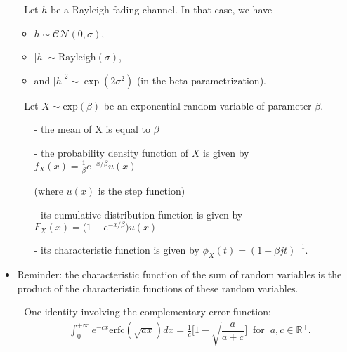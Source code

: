 \documentclass [a4paper, 11pt] {article}
\begin{document}
\begin{exercise}{1}
\begin{itemize}
    \item[-] Let $h$ be a Rayleigh fading channel. In that case, we have
    \begin{itemize}
        \item $h \sim \mathcal{C}\mathcal{N}(0,\sigma)$,
        \item $|h| \sim \text{Rayleigh}(\sigma)$,
        \item and $|h|^2 \sim \exp(2\sigma^2)$ (in the beta parametrization).
    \end{itemize}

    \item[-] Let $X \sim \text{exp}(\beta)$ be an exponential random variable of parameter $\beta$.

    \begin{itemize}
    \item[-] the mean of X is equal to $\beta$
    \item[-] the probability density function of $X$ is given by $f_X(x) = \frac{1}{\beta}e^{-x/\beta}u(x)$
    \item[] (where $u(x)$ is the step function)
    \item[-] its cumulative distribution function is given by $F_X(x) = \big(1 - e^{-x/\beta}\big)u(x)$
    \item[-] its characteristic function is given by $\phi_X(t) = (1-\beta jt)^{-1}$.
    \end{itemize}
    \item Reminder: the characteristic function of the sum of random variables is the product of the characteristic functions of these random variables.
    \item[-] One identity involving the complementary error function:
    \begin{align}
    &\int^{+\infty}_{0}e^{-cx}\text{erfc}(\sqrt{ax}) dx = \frac{1}{c} \bigg[1-\sqrt{\dfrac{a}{a+c}}\bigg] \; \; \text{for} \; \; a,c \in \mathbb{R}^+.
    \end{align}

\end{itemize}
    \end{exercise}
\end{document}
